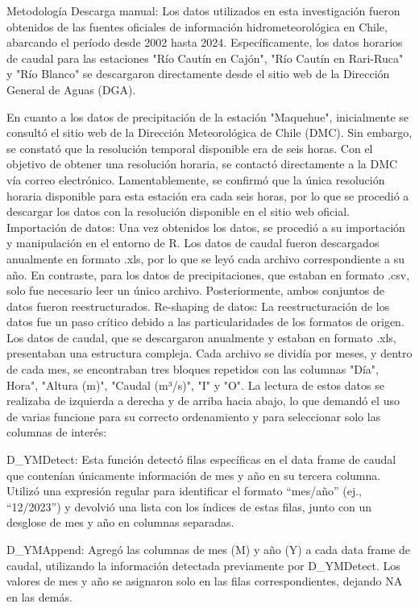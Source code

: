 \documentclass[hess, manuscript]{copernicus}
\begin{document}
Metodología
Descarga manual:
Los datos utilizados en esta investigación fueron obtenidos de las fuentes oficiales de información hidrometeorológica en Chile, abarcando el período desde 2002 hasta 2024. Específicamente, los datos horarios de caudal para las estaciones "Río Cautín en Cajón", "Río Cautín en Rari-Ruca" y "Río Blanco" se descargaron directamente desde el sitio web de la Dirección General de Aguas (DGA).

En cuanto a los datos de precipitación de la estación "Maquehue", inicialmente se consultó el sitio web de la Dirección Meteorológica de Chile (DMC). Sin embargo, se constató que la resolución temporal disponible era de seis horas. Con el objetivo de obtener una resolución horaria, se contactó directamente a la DMC vía correo electrónico. Lamentablemente, se confirmó que la única resolución horaria disponible para esta estación era cada seis horas, por lo que se procedió a descargar los datos con la resolución disponible en el sitio web oficial.
Importación de datos:
Una vez obtenidos los datos, se procedió a su importación y manipulación en el entorno de R. Los datos de caudal fueron descargados anualmente en formato .xls, por lo que se leyó cada archivo correspondiente a su año. En contraste, para los datos de precipitaciones, que estaban en formato .csv, solo fue necesario leer un único archivo. Posteriormente, ambos conjuntos de datos fueron reestructurados.
Re-shaping de datos:
La reestructuración de los datos fue un paso crítico debido a las particularidades de los formatos de origen. Los datos de caudal, que se descargaron anualmente y estaban en formato .xls, presentaban una estructura compleja. Cada archivo se dividía por meses, y dentro de cada mes, se encontraban tres bloques repetidos con las columnas "Día", Hora", "Altura (m)", "Caudal (m³/s)", "I" y "O". La lectura de estos datos se realizaba de izquierda a derecha y de arriba hacia abajo, lo que demandó el uso de varias funcione para su correcto ordenamiento y para seleccionar solo las columnas de interés:

D_YMDetect: Esta función detectó filas específicas en el data frame de caudal que contenían únicamente información de mes y año en su tercera columna. Utilizó una expresión regular para identificar el formato “mes/año” (ej., “12/2023”) y devolvió una lista con los índices de estas filas, junto con un desglose de mes y año en columnas separadas.

D_YMAppend: Agregó las columnas de mes (M) y año (Y) a cada data frame de caudal, utilizando la información detectada previamente por D_YMDetect. Los valores de mes y año se asignaron solo en las filas correspondientes, dejando NA en las demás.
\end{document}
